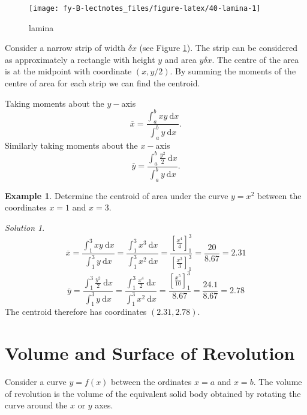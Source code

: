 \documentclass[
  11pt,
  oneside]{book}
\newcommand{\slide}{}
\theoremstyle{definition}
\theoremstyle{definition}
\newtheorem{example}{Example}[chapter]
\theoremstyle{definition}
\theoremstyle{definition}
\theoremstyle{remark}
\newtheorem*{solution}{Solution}
\begin{document}
\begin{figure}

{\centering \texttt{[image: fy-B-lectnotes\_files/figure-latex/40-lamina-1]} 

}

\caption{lamina}\label{fig:40-lamina}
\end{figure}

Consider a narrow strip of width \(\delta x\) (see Figure \ref{fig:40-lamina}). The strip can be considered as approximately a rectangle with height \(y\) and area \(y\delta x\). The centre of the area is at the midpoint with coordinate \((x,y/2)\). By summing the moments of the centre of area for each strip we can find the centroid.

\slide

Taking moments about the \(y-\)axis
\[
\overline x = \frac{\displaystyle\int_a^bxy\ \mathrm{d}x}{\displaystyle\int_a^b y\ \mathrm{d}x}.
\]
Similarly taking moments about the \(x-\)axis
\[
\overline y = \frac{\displaystyle\int_a^b \frac{y^2}2\ \mathrm{d}x}{\displaystyle\int_a^b y\ \mathrm{d}x}.
\]
\slide

\begin{example}
Determine the centroid of area under the curve \(y=x^2\) between the coordinates \(x=1\) and \(x=3\).
\end{example}

\begin{solution}
\[
\overline x = \frac{\displaystyle\int_1^3xy\ \mathrm{d}x}{\displaystyle\int_1^3 y\ \mathrm{d}x} = \frac{\displaystyle\int_1^3x^3\ \mathrm{d}x}{\displaystyle\int_1^3x^2\ \mathrm{d}x} = \frac{\left[\frac{x^4}{4}\right]_1^3}{\left[\frac{x^3}{3}\right]_1^3} = \frac{20}{8.67} = 2.31
\]
\[
\overline y = \frac{\displaystyle\int_1^3\frac{y^2}2\ \mathrm{d}x}{\displaystyle\int_1^3 y\ \mathrm{d}x} = \frac{\displaystyle\int_1^3\frac{x^4}2\ \mathrm{d}x}{\displaystyle\int_1^3x^2\ \mathrm{d}x} = \frac{\left[\frac{x^5}{10}\right]_1^3}{8.67} = \frac{24.1}{8.67} = 2.78
\]
The centroid therefore has coordinates \((2.31,2.78)\).
\end{solution}

\slide

\section{Volume and Surface of Revolution}\label{volume-and-surface-of-revolution}

Consider a curve \(y = f(x)\) between the ordinates \(x = a\) and \(x = b\). The volume of revolution is the volume of the equivalent solid body obtained by rotating the curve around the \(x\) or \(y\) axes.
\end{document}
